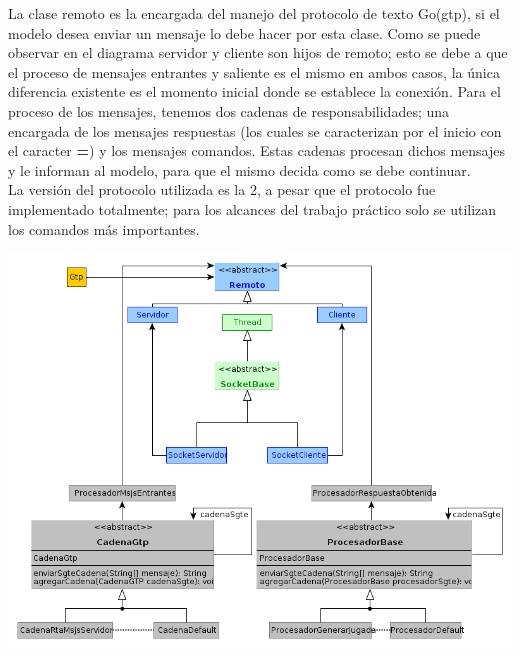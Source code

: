 La clase remoto es la encargada del manejo del protocolo de texto Go(gtp), 
si el modelo desea enviar un mensaje lo debe hacer por esta clase. 
Como se puede observar en el diagrama servidor y cliente son hijos de remoto; 
esto se debe a que el proceso de mensajes entrantes y saliente es el mismo en ambos casos, 
la \'unica diferencia existente es el momento inicial donde se establece la conexi\'on. 
Para el proceso de los mensajes, tenemos dos cadenas de responsabilidades; una encargada de los mensajes respuestas
(los cuales se caracterizan por el inicio con el caracter \textbf{=}) y los mensajes comandos. 
Estas cadenas procesan dichos mensajes y le informan al modelo, para que el mismo decida como se debe continuar. \\
La versi\'on del protocolo utilizada es la 2, a pesar que el protocolo fue implementado totalmente; 
para los alcances del trabajo pr\'actico solo se utilizan los comandos m\'as importantes.

\begin{center}
\includegraphics[scale=0.6]{./Diagramas/DiagramaRemoto/diagrama_remoto.png}
\end{center}
